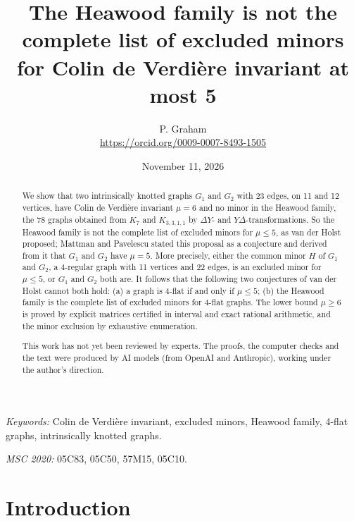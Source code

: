 \documentclass[11pt]{article}
\title{The Heawood family is not the complete list of excluded minors for Colin de Verdière invariant at most 5}
\author{P. Graham\\ \small\url{https://orcid.org/0009-0007-8493-1505}}
\date{November 11, 2026}
\theoremstyle{remark}
\begin{document}
\maketitle
\begin{abstract}
We show that two intrinsically knotted graphs $G_1$ and $G_2$ with 23
edges, on 11 and 12 vertices, have Colin de Verdière invariant $\mu=6$ and
no minor in the Heawood family, the 78 graphs obtained from $K_7$ and
$K_{3,3,1,1}$ by $\Delta Y$- and $Y\Delta$-transformations. So the Heawood
family is not the complete list of excluded minors for $\mu\le5$, as van
der Holst proposed; Mattman and Pavelescu stated this proposal as a
conjecture and derived from it that $G_1$ and $G_2$ have $\mu=5$. More
precisely, either the common minor $H$ of $G_1$ and $G_2$, a 4-regular
graph with 11 vertices and 22 edges, is an excluded minor for $\mu\le5$, or
$G_1$ and $G_2$ both are. It follows that the following two conjectures of
van der Holst cannot both hold: (a) a graph is 4-flat if and only if
$\mu\le5$; (b) the Heawood family is the complete list of excluded minors
for 4-flat graphs. The lower bound $\mu\ge6$ is proved by explicit matrices
certified in interval and exact rational arithmetic, and the minor
exclusion by exhaustive enumeration.

This work has not yet been reviewed by experts.
The proofs, the computer checks and the text were produced by AI models
(from OpenAI and Anthropic), working under the author's direction.
\end{abstract}
\medskip
\noindent\textit{Keywords:} Colin de Verdière invariant, excluded minors,
Heawood family, 4-flat graphs, intrinsically knotted graphs.

\noindent\textit{MSC 2020:} 05C83, 05C50, 57M15, 05C10.

\section{Introduction}
\end{document}

